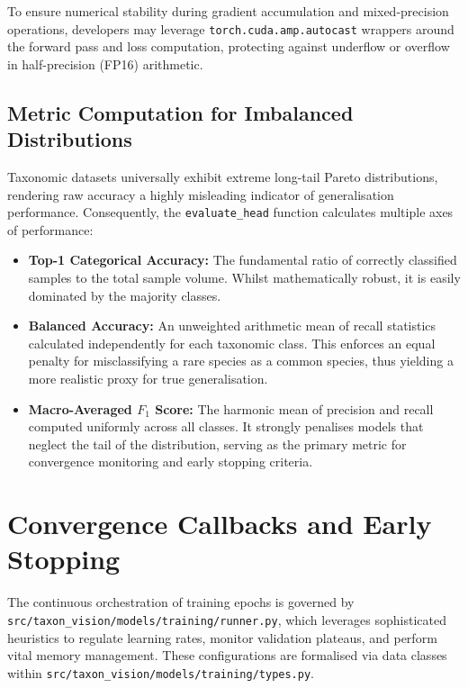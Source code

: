To ensure numerical stability during gradient accumulation and mixed-precision operations, developers may leverage \texttt{torch.cuda.amp.autocast} wrappers around the forward pass and loss computation, protecting against underflow or overflow in half-precision (FP16) arithmetic.

\subsection{Metric Computation for Imbalanced Distributions}

Taxonomic datasets universally exhibit extreme long-tail Pareto distributions, rendering raw accuracy a highly misleading indicator of generalisation performance. Consequently, the \texttt{evaluate\_head} function calculates multiple axes of performance:

\begin{itemize}
    \item \textbf{Top-1 Categorical Accuracy:} The fundamental ratio of correctly classified samples to the total sample volume. Whilst mathematically robust, it is easily dominated by the majority classes.
    \item \textbf{Balanced Accuracy:} An unweighted arithmetic mean of recall statistics calculated independently for each taxonomic class. This enforces an equal penalty for misclassifying a rare species as a common species, thus yielding a more realistic proxy for true generalisation.
    \item \textbf{Macro-Averaged $F_1$ Score:} The harmonic mean of precision and recall computed uniformly across all classes. It strongly penalises models that neglect the tail of the distribution, serving as the primary metric for convergence monitoring and early stopping criteria.
\end{itemize}

\section{Convergence Callbacks and Early Stopping}
\label{sec:convergence_callbacks}

The continuous orchestration of training epochs is governed by\\\texttt{src/taxon\_vision/models/training/runner.py}, which leverages sophisticated heuristics to regulate learning rates, monitor validation plateaus, and perform vital memory management. These configurations are formalised via data classes within \texttt{src/taxon\_vision/models/training/types.py}.

